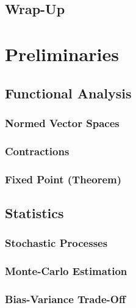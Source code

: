 	\section{Wrap-Up} %

\chapter{Preliminaries} %

	\section{Functional Analysis} %

		\subsection{Normed Vector Spaces} %

		\subsection{Contractions} %

		\subsection{Fixed Point (Theorem)} %

	\section{Statistics} %

		\subsection{Stochastic Processes} %

		\subsection{Monte-Carlo Estimation} %

		\subsection{Bias-Variance Trade-Off} %


